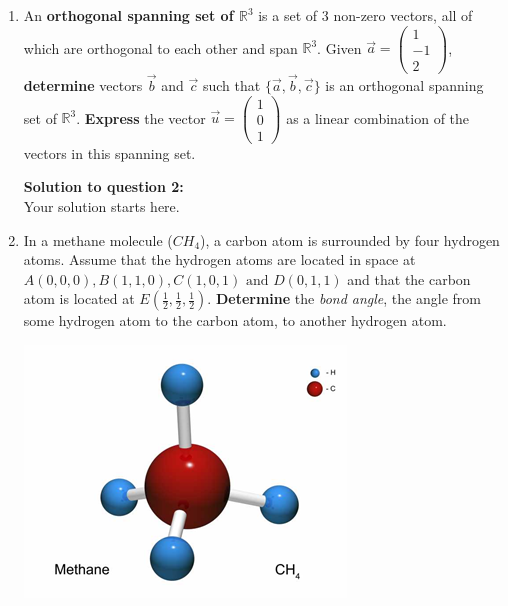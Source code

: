 \documentclass[12pt]{book}
\begin{document}
\begin{enumerate}

\newpage

\item An \textbf{orthogonal spanning set of $\mathbb{R}^3$} is a set of 3 non-zero vectors, all of which are orthogonal to each other and span $\mathbb{R}^3$. Given $\vec{a} = \left(\begin{smallmatrix} 1 \\ -1 \\ 2 \end{smallmatrix}\right)$, \textbf{determine} vectors $\vec{b}$ and $\vec{c}$ such that $\{\vec{a}, \vec{b}, \vec{c}\}$ is an orthogonal spanning set of $\mathbb{R}^3$. \textbf{Express} the vector $\vec{u}= \left(\begin{smallmatrix} 1 \\ 0 \\ 1 \end{smallmatrix}\right)$ as a linear combination of the vectors in this spanning set. 

\vspace{0.3cm} 
\textbf{Solution to question 2:}\\
 Your solution starts here.
\vspace{0.3cm}

\newpage

\item In a methane molecule ($CH_4$), a carbon atom is surrounded by four hydrogen atoms. Assume that the hydrogen atoms are located in space at $A(0,0,0), B(1,1,0), C(1,0,1) \textrm{ and } D(0,1,1)$ and that the carbon atom is located at $E\left(\frac{1}{2},\frac{1}{2},\frac{1}{2}\right)$. \textbf{Determine} the \emph{bond angle}, the angle from some hydrogen atom to the carbon atom, to another hydrogen atom.

\includegraphics[scale=2]{Methane.png}


\end{enumerate}
\end{document}
